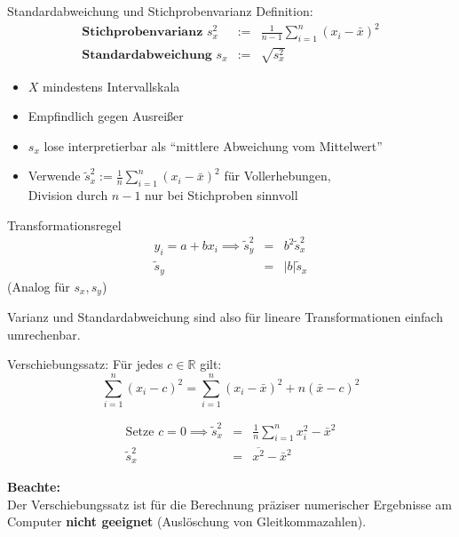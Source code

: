 \documentclass[
  10pt,
  ignorenonframetext,
]{beamer}
\providecommand{\tightlist}{%
  \setlength{\itemsep}{0pt}\setlength{\parskip}{0pt}}
\begin{document}
\begin{frame}{Standardabweichung und Stichprobenvarianz}
\protect\hypertarget{standardabweichung-und-stichprobenvarianz}{}
Definition: \begin{eqnarray*}
\textbf{Stichprobenvarianz } s_x^2 &:=& \frac{1}{n-1} \sum_{i=1}^n (x_i - \bar x)^2 \\
\textbf{Standardabweichung } s_x &:=& \sqrt{s_x^2}
\end{eqnarray*}

\begin{itemize}
\tightlist
\item
  \(X\) mindestens Intervallskala
\item
  Empfindlich gegen Ausreißer
\item
  \(s_x\) lose interpretierbar als ``mittlere Abweichung vom
  Mittelwert''
\item
  Verwende
  \(\widetilde{s}_x^2:= \frac{1}{n} \sum_{i=1}^n (x_i - \bar x)^2\) für
  Vollerhebungen,\\
  Division durch \(n-1\) nur bei Stichproben sinnvoll
\end{itemize}
\end{frame}

\begin{frame}{Transformationsregel}
\protect\hypertarget{transformationsregel}{}
\begin{eqnarray*}
 y_i = a + bx_i \implies \widetilde s_y^2 &=& b^2 \widetilde s_x^2 \\
   \widetilde s_y &=& |b| \widetilde s_x
\end{eqnarray*} (Analog für \(s_x, s_y\))

Varianz und Standardabweichung sind also für lineare Transformationen
einfach umrechenbar.
\end{frame}

\begin{frame}{Verschiebungssatz:}
\protect\hypertarget{verschiebungssatz}{}
Für jedes \(c \in \mathbb R\) gilt: \begin{equation*}
  \sum_{i=1}^n (x_i - c)^2 = \sum_{i=1}^n (x_i - \bar x)^2 + n (\bar x -
c)^2
\end{equation*}

\begin{eqnarray*}
\text{Setze }  c=0 \implies \widetilde s_x^2 &=& \frac{1}{n} \sum_{i=1}^n x_i^2 - \bar
x^2 \\
  \widetilde s_x^2 &=& \overline{x^2} - \bar x^2
\end{eqnarray*}

\textbf{Beachte:}\\
Der Verschiebungssatz ist für die Berechnung präziser numerischer
Ergebnisse am Computer \textbf{nicht geeignet} (Auslöschung von
Gleitkommazahlen).
\end{frame}
\end{document}
